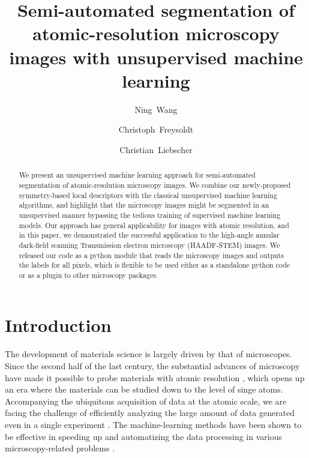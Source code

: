 \documentclass[twocolumn,amsmath, floatfix]{revtex4}
\begin{document}
\title { Semi-automated segmentation of atomic-resolution microscopy images with unsupervised machine learning}
\author{Ning~Wang}
\author{Christoph~Freysoldt}
\author{Christian~Liebscher}
\begin{abstract}

We present an unsupervised machine learning approach for semi-automated segmentation of 
atomic-resolution microscopy images. 
We combine our newly-proposed symmetry-based local descriptors with the classical unsupervised machine learning algorithms, and highlight that the microscopy images might be segmented in an unsupervised manner bypassing the tedious training of supervised machine learning models.
Our approach has general applicability for images with atomic resolution, and in this paper, we demonstrated the successful application to the high-angle annular dark-field scanning Transmission electron microscopy (HAADF-STEM) images. 
We released our code as a python module that reads the microscopy images and outputs the labels for all pixels, which is flexible to be used either as a standalone python code or as a plugin to other microscopy packages. 

\end{abstract}

\maketitle

\section{Introduction}
The development of materials science is largely driven by that of microscopes. Since the second half of the last century, the substantial advances of microscopy have made it possible to probe materials with atomic resolution \cite{Hansma209}, which opens up an era where the materials can be studied down to the level of singe atoms. 
Accompanying the ubiquitous acquisition of data at the atomic scale, we are facing the challenge of efficiently analyzing the large amount of data generated even in a single experiment \cite{Sergei2015}. The machine-learning methods have been shown to be effective in speeding up and automatizing the data processing in various microscopy-related problems \cite{Kaufmann2020,Sergei2019, Sergei2020}.
\end{document}
